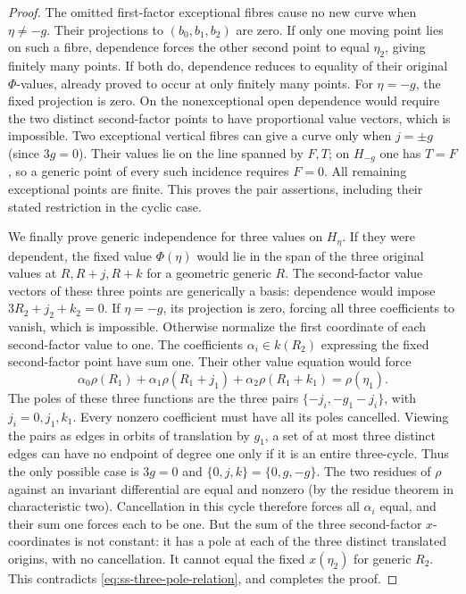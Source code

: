 \begin{proof}
The omitted first-factor exceptional fibres cause no new curve
when $\eta\ne-g$. Their projections to $(b_0,b_1,b_2)$ are zero.
If only one moving point lies on such a fibre, dependence forces
the other second point to equal $\eta_2$, giving finitely many
points. If both do, dependence reduces to equality of their
original $\Phi$-values, already proved to occur at only finitely
many points. For $\eta=-g$, the fixed projection is zero.
On the nonexceptional open dependence would require the two
distinct second-factor points to have proportional value vectors,
which is impossible. Two exceptional vertical fibres can give
a curve only when $j=\pm g$ (since $3g=0$). Their values lie on
the line spanned by $F,T$; on $H_{-g}$ one has $T=F$, so a
generic point of every such incidence requires $F=0$.
All remaining exceptional points are finite. This proves the
pair assertions, including their stated restriction in the cyclic case.

We finally prove generic independence for three values on
$H_\eta$. If they were dependent, the fixed value
$\Phi(\eta)$ would lie in the span of the three original values
at $R,R+j,R+k$ for a geometric generic $R$.
The second-factor value vectors of these three points are generically
a basis: dependence would impose $3R_2+j_2+k_2=0$.
If $\eta=-g$, its projection is zero, forcing all three coefficients
to vanish, which is impossible.
Otherwise normalize the first coordinate of each second-factor
value to one. The coefficients $\alpha_i\in k(R_2)$ expressing
the fixed second-factor point have sum one. Their other value
equation would force
\begin{equation}\label{eq:ss-three-pole-relation}
       \alpha_0\rho(R_1)+\alpha_1\rho(R_1+j_1)
             +\alpha_2\rho(R_1+k_1)=\rho(\eta_1).
\end{equation}
The poles of these three functions are the three pairs
$\{-j_i,-g_1-j_i\}$, with $j_i=0,j_1,k_1$.
Every nonzero coefficient must have all its poles cancelled.
Viewing the pairs as edges in orbits of translation by $g_1$,
a set of at most three distinct edges can have no endpoint of
degree one only if it is an entire three-cycle. Thus the only
possible case is $3g=0$ and $\{0,j,k\}=\{0,g,-g\}$.
The two residues of $\rho$ against an invariant differential are
equal and nonzero (by the residue theorem in characteristic two).
Cancellation in this cycle therefore forces all $\alpha_i$ equal,
and their sum one forces each to be one. But the sum of the three
second-factor $x$-coordinates is not constant: it has a pole at
each of the three distinct translated origins, with no cancellation.
It cannot equal the fixed $x(\eta_2)$ for generic $R_2$.
This contradicts \eqref{eq:ss-three-pole-relation}, and
completes the proof.
\end{proof}

